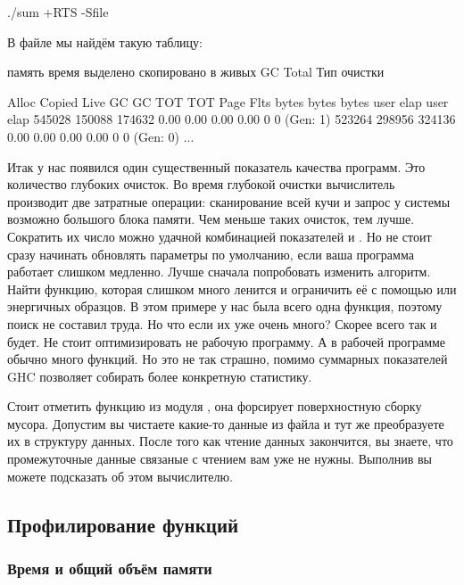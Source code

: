 \begin{code}
./sum +RTS -Sfile
\end{code}

В файле  мы найдём такую таблицу:


\begin{code}
        память                          время
выделено скопировано в живых    GC             Total             Тип очистки

 Alloc    Copied     Live    GC    GC     TOT     TOT  Page Flts
 bytes     bytes     bytes  user  elap    user    elap
545028    150088    174632  0.00  0.00    0.00    0.00    0    0  (Gen:  1)
523264    298956    324136  0.00  0.00    0.00    0.00    0    0  (Gen:  0)
...
\end{code}

Итак у нас появился один существенный показатель качества программ. Это
количество глубоких очисток. Во время глубокой очистки вычислитель
производит две затратные операции: сканирование всей кучи и запрос у
системы возможно большого блока памяти. Чем меньше таких очисток, тем
лучше. Сократить их число можно удачной комбинацией показателей  и
. Но не стоит сразу начинать обновлять параметры по умолчанию,
если ваша программа работает слишком медленно. Лучше сначала попробовать
изменить алгоритм. Найти функцию, которая слишком много ленится и
ограничить её с помощью  или энергичных образцов. В этом примере
у нас была всего одна функция, поэтому поиск не составил труда. Но что
если их уже очень много? Скорее всего так и будет. Не стоит
оптимизировать не рабочую программу. А в рабочей программе обычно много
функций. Но это не так страшно, помимо суммарных показателей GHC
позволяет собирать более конкретную статистику.

Стоит отметить функцию  из модуля , она
форсирует поверхностную сборку мусора. Допустим вы чистаете какие-то
данные из файла и тут же преобразуете их в структуру данных. После того
как чтение данных закончится, вы знаете, что промежуточные данные
связаные с чтением вам уже не нужны. Выполнив  вы можете
подсказать об этом вычислителю.

\subsection{Профилирование функций}

\subsubsection{Время и общий объём памяти}

